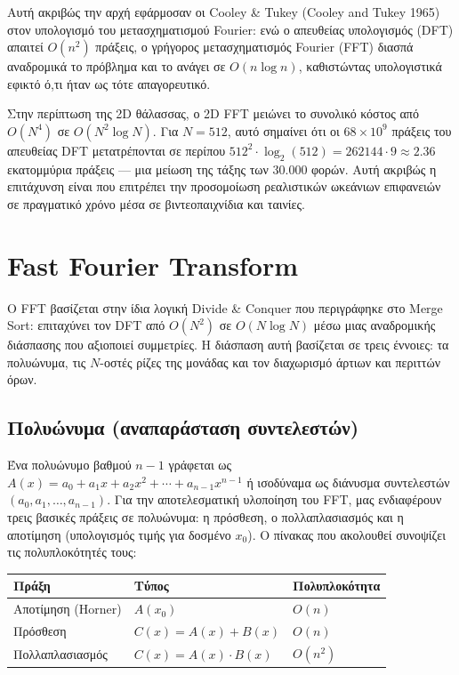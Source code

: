 \documentclass[a4paper, 11pt]{article}
\begin{document}
Αυτή ακριβώς την αρχή εφάρμοσαν οι Cooley \& Tukey (Cooley and Tukey
1965) στον υπολογισμό του μετασχηματισμού Fourier: ενώ ο απευθείας
υπολογισμός (DFT) απαιτεί \(O(n^2)\) πράξεις, ο γρήγορος μετασχηματισμός
Fourier (FFT) διασπά αναδρομικά το πρόβλημα και το ανάγει σε
\(O(n \log n)\), καθιστώντας υπολογιστικά εφικτό ό,τι ήταν ως τότε
απαγορευτικό.

Στην περίπτωση της 2D θάλασσας, ο 2D FFT μειώνει το συνολικό κόστος από
\(O(N^4)\) σε \(O(N^2 \log N)\). Για \(N=512\), αυτό σημαίνει ότι οι
\(68 \times 10^9\) πράξεις του απευθείας DFT μετατρέπονται σε περίπου
\(512^2 \cdot \log_2(512) = 262144 \cdot 9 \approx 2.36\) εκατομμύρια
πράξεις --- μια μείωση της τάξης των 30.000 φορών. Αυτή ακριβώς η
επιτάχυνση είναι που επιτρέπει την προσομοίωση ρεαλιστικών ωκεάνιων
επιφανειών σε πραγματικό χρόνο μέσα σε βιντεοπαιχνίδια και ταινίες.

\section{Fast Fourier Transform}\label{fast-fourier-transform}

Ο FFT βασίζεται στην ίδια λογική Divide \& Conquer που περιγράφηκε στο
Merge Sort: επιταχύνει τον DFT από \(O(N^2)\) σε \(O(N \log N)\) μέσω
μιας αναδρομικής διάσπασης που αξιοποιεί συμμετρίες. Η διάσπαση αυτή
βασίζεται σε τρεις έννοιες: τα πολυώνυμα, τις \(N\)-οστές ρίζες της
μονάδας και τον διαχωρισμό άρτιων και περιττών όρων.

\subsection{Πολυώνυμα (αναπαράσταση
συντελεστών)}\label{ux3c0ux3bfux3bbux3c5ux3ceux3bdux3c5ux3bcux3b1-ux3b1ux3bdux3b1ux3c0ux3b1ux3c1ux3acux3c3ux3c4ux3b1ux3c3ux3b7-ux3c3ux3c5ux3bdux3c4ux3b5ux3bbux3b5ux3c3ux3c4ux3ceux3bd}

Ένα πολυώνυμο βαθμού \(n-1\) γράφεται ως
\(A(x) = a_0 + a_1 x + a_2 x^2 + \cdots + a_{n-1} x^{n-1}\) ή ισοδύναμα
ως διάνυσμα συντελεστών \((a_0, a_1, \ldots, a_{n-1})\). Για την
αποτελεσματική υλοποίηση του FFT, μας ενδιαφέρουν τρεις βασικές πράξεις
σε πολυώνυμα: η πρόσθεση, ο πολλαπλασιασμός και η αποτίμηση (υπολογισμός
τιμής για δοσμένο \(x_0\)). Ο πίνακας που ακολουθεί συνοψίζει τις
πολυπλοκότητές τους:

\begin{longtable}[]{@{}lll@{}}
\toprule\noalign{}
Πράξη & Τύπος & Πολυπλοκότητα \\
\midrule\noalign{}
\endhead
\bottomrule\noalign{}
\endlastfoot
Αποτίμηση (Horner) & \(A(x_0)\) & \(O(n)\) \\
Πρόσθεση & \(C(x) = A(x) + B(x)\) & \(O(n)\) \\
Πολλαπλασιασμός & \(C(x) = A(x) \cdot B(x)\) & \(O(n^2)\) \\
\end{longtable}
\end{document}
